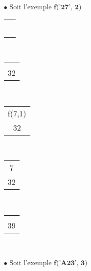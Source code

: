 \documentclass[a4paper, 11pt, oneside]{article}
\begin{document}
	\begin{itemize}
		
		\item[$\bullet$] Soit l'exemple $\textbf{f('27', 2)}$
		\\
	
		\begin{center}
			\begin{tabular}{|c|}
				\\
				\\
				\textcolor{white}{--}\\
				\hline
			\end{tabular}~
			\begin{tabular}{|c|}
				\\
				\\
				32\\
				\hline
			\end{tabular}~
			\begin{tabular}{|c|}
				\\
				f(7,1)\\
				32\\
				\hline
			\end{tabular}~
			\begin{tabular}{|c|}
				\\
				7\\
				32\\
				\hline
			\end{tabular}~
			\begin{tabular}{|c|}
				\\
				\\
				39\\
				\hline
			\end{tabular}~
		\end{center}
		
		\vspace{5mm}
		\item[$\bullet$]Soit l'exemple $\textbf{f('A23', 3)}$
		\\
		
		\begin{center}
		

\end{center}
\end{itemize}
\end{document}
